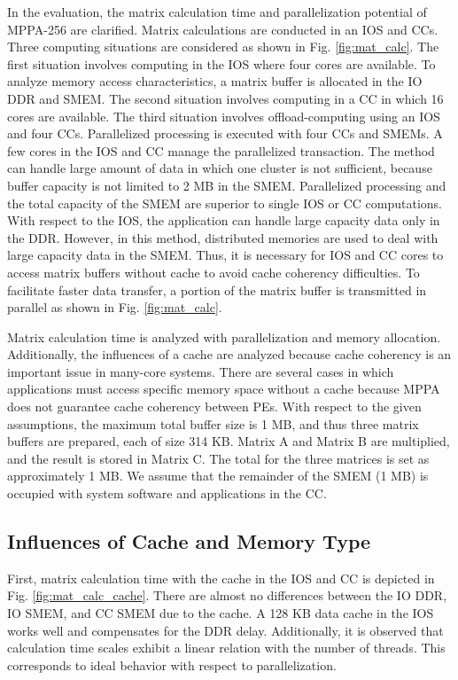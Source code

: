 In the evaluation, the matrix calculation time and parallelization potential of MPPA-256 are clarified.
Matrix calculations are conducted in an IOS and CCs.
Three computing situations are considered as shown in Fig. \ref{fig:mat_calc}.
The first situation involves computing in the IOS where four cores are available.
To analyze memory access characteristics, a matrix buffer is allocated in the IO DDR and SMEM.
The second situation involves computing in a CC in which 16 cores are available.
The third situation involves offload-computing using an IOS and four CCs.
Parallelized processing is executed with four CCs and SMEMs.
A few cores in the IOS and CC manage the parallelized transaction.
The method can handle large amount of data in which one cluster is not sufficient, because buffer capacity is not limited to 2 MB in the SMEM.
Parallelized processing and the total capacity of the SMEM are superior to single IOS or CC computations. 
With respect to the IOS, the application can handle large capacity data only in the DDR.
However, in this method, distributed memories are used to deal with large capacity data in the SMEM.
Thus, it is necessary for IOS and CC cores to access matrix buffers without cache to avoid cache coherency difficulties.
To facilitate faster data transfer, a portion of the matrix buffer is transmitted in parallel as shown in Fig. \ref{fig:mat_calc}.

Matrix calculation time is analyzed with parallelization and memory allocation.
Additionally, the influences of a cache are analyzed because cache coherency is an important issue in many-core systems.
There are several cases in which applications must access specific memory space without a cache because MPPA does not guarantee cache coherency between PEs.
With respect to the given assumptions, the maximum total buffer size is 1 MB, and thus three matrix buffers are prepared, each of size 314 KB.
Matrix A and Matrix B are multiplied, and the result is stored in Matrix C.
The total for the three matrices is set as approximately 1 MB.
We assume that the remainder of the SMEM (1 MB) is occupied with system software and applications in the CC.

\subsection{Influences of Cache and Memory Type}
\label{sec:cache_and_memory}
First, matrix calculation time with the cache in the IOS and CC is depicted in Fig. \ref{fig:mat_calc_cache}.
There are almost no differences between the IO DDR, IO SMEM, and CC SMEM due to the cache.
A 128 KB data cache in the IOS works well and compensates for the DDR delay.
Additionally, it is observed that calculation time scales exhibit a linear relation with the number of threads.
This corresponds to ideal behavior with respect to parallelization.


